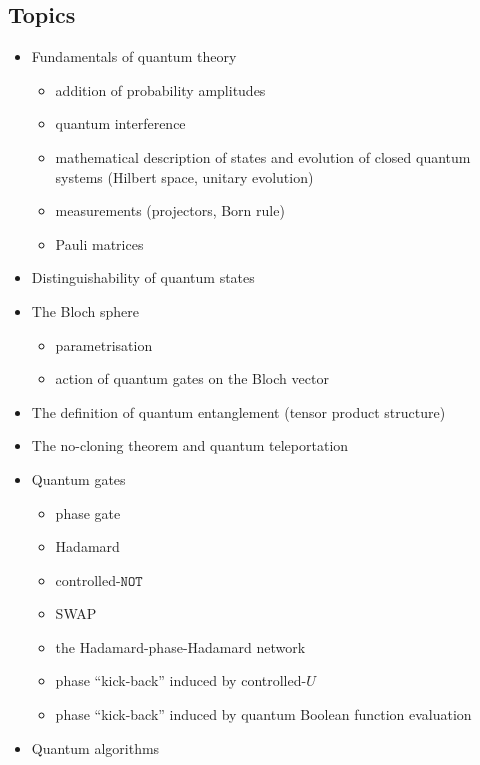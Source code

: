 \documentclass[fleqn]{article}
\providecommand{\tightlist}{%
  \setlength{\itemsep}{0pt}\setlength{\parskip}{0pt}}
\begin{document}
\hypertarget{topics}{%
\subsection*{Topics}\label{topics}}

\begin{itemize}
\tightlist
\item
  Fundamentals of quantum theory

  \begin{itemize}
  \tightlist
  \item
    addition of probability amplitudes
  \item
    quantum interference
  \item
    mathematical description of states and evolution of closed quantum systems (Hilbert space, unitary evolution)
  \item
    measurements (projectors, Born rule)
  \item
    Pauli matrices
  \end{itemize}
\item
  Distinguishability of quantum states
\item
  The Bloch sphere

  \begin{itemize}
  \tightlist
  \item
    parametrisation
  \item
    action of quantum gates on the Bloch vector
  \end{itemize}
\item
  The definition of quantum entanglement (tensor product structure)
\item
  The no-cloning theorem and quantum teleportation
\item
  Quantum gates

  \begin{itemize}
  \tightlist
  \item
    phase gate
  \item
    Hadamard
  \item
    controlled-\(\texttt{NOT}\)
  \item
    SWAP
  \item
    the Hadamard-phase-Hadamard network
  \item
    phase ``kick-back'' induced by controlled-\(U\)
  \item
    phase ``kick-back'' induced by quantum Boolean function evaluation
  \end{itemize}
\item
  Quantum algorithms


\end{itemize}
\end{document}
